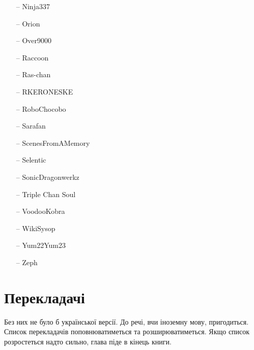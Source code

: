 \begin{multicols}{3}
\begin{itemize}
	\item[--] Ninja337
	\item[--] Orion
	\item[--] Over9000
	\item[--] Raccoon
	\item[--] Ras-chan
	\item[--] RKERONESKE
	\item[--] RoboChocobo
	\item[--] Sarafan
	\item[--] ScenesFromAMemory
	\item[--] Selentic
	\item[--] SonicDragonwerkz
	\item[--] Triple Chan Soul
	\item[--] VoodooKobra
	\item[--] WikiSysop
	\item[--] Yum22Yum23
	\item[--] Zeph
\end{itemize}
\end{multicols}

\section{Перекладачі}
Без них не було б української версії. До речі, вчи іноземну мову, пригодиться.
Список перекладачів поповнюватиметься та розширюватиметься. Якщо список
розростеться надто сильно, глава піде в кінець книги.